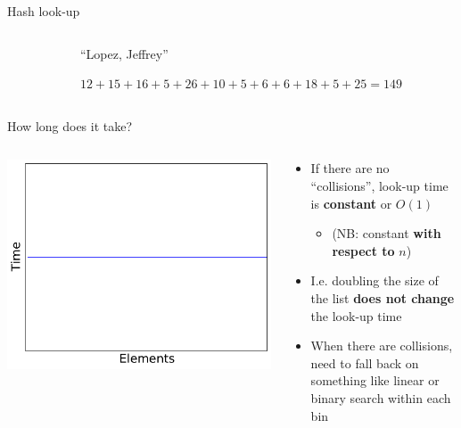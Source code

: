 \begin{frame}{Hash look-up}
	\begin{columns}
		\begin{column}{0.3\textwidth}
			{\tiny
			\begin{tabular}{|c|l|} \hline
				
			\end{tabular}
			}
		\end{column}
		\begin{column}{0.66\textwidth}
			``Lopez, Jeffrey'' \pause
			
			$12 + 15 + 16 + 5 + 26 + 10 + 5 + 6 + 6 + 18 + 5 + 25 = 149$
		\end{column}
	\end{columns}
\end{frame}

\begin{frame}{How long does it take?}
	\begin{columns}
		\begin{column}{0.45\textwidth}
			\includegraphics[width=\textwidth]{plot2_constant}
		\end{column}
		\begin{column}{0.55\textwidth}
			\begin{itemize}
				\item If there are no ``collisions'', look-up time is \textbf{constant} or $O(1)$ \pause
					\begin{itemize}
						\item (NB: constant \textbf{with respect to} $n$) \pause
					\end{itemize}
				\item I.e. doubling the size of the list \textbf{does not change} the look-up time \pause
				\item When there are collisions, need to fall back on something like linear or binary search within each bin
			\end{itemize}
		\end{column}
	\end{columns}
\end{frame}
\fi

